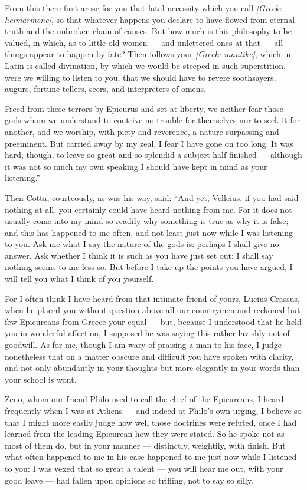  From this there first arose for you that fatal necessity which you call \textit{[Greek: heimarmene]}, so that whatever happens you declare to have flowed from eternal truth and the unbroken chain of causes. But how much is this philosophy to be valued, in which, as to little old women — and unlettered ones at that — all things appear to happen by fate? Then follows your \textit{[Greek: mantike]}, which in Latin is called divination, by which we would be steeped in such superstition, were we willing to listen to you, that we should have to revere soothsayers, augurs, fortune-tellers, seers, and interpreters of omens.

 Freed from these terrors by Epicurus and set at liberty, we neither fear those gods whom we understand to contrive no trouble for themselves nor to seek it for another, and we worship, with piety and reverence, a nature surpassing and preeminent. But carried away by my zeal, I fear I have gone on too long. It was hard, though, to leave so great and so splendid a subject half-finished — although it was not so much my own speaking I should have kept in mind as your listening.''

 Then Cotta, courteously, as was his way, said: ``And yet, Velleius, if you had said nothing at all, you certainly could have heard nothing from me. For it does not usually come into my mind so readily why something is true as why it is false; and this has happened to me often, and not least just now while I was listening to you. Ask me what I say the nature of the gods is: perhaps I shall give no answer. Ask whether I think it is such as you have just set out: I shall say nothing seems to me less so. But before I take up the points you have argued, I will tell you what I think of you yourself.

 For I often think I have heard from that intimate friend of yours, Lucius Crassus, when he placed you without question above all our countrymen and reckoned but few Epicureans from Greece your equal — but, because I understood that he held you in wonderful affection, I supposed he was saying this rather lavishly out of goodwill. As for me, though I am wary of praising a man to his face, I judge nonetheless that on a matter obscure and difficult you have spoken with clarity, and not only abundantly in your thoughts but more elegantly in your words than your school is wont.

 Zeno, whom our friend Philo used to call the chief of the Epicureans, I heard frequently when I was at Athens — and indeed at Philo's own urging, I believe so that I might more easily judge how well those doctrines were refuted, once I had learned from the leading Epicurean how they were stated. So he spoke not as most of them do, but in your manner — distinctly, weightily, with finish. But what often happened to me in his case happened to me just now while I listened to you: I was vexed that so great a talent — you will hear me out, with your good leave — had fallen upon opinions so trifling, not to say so silly.

